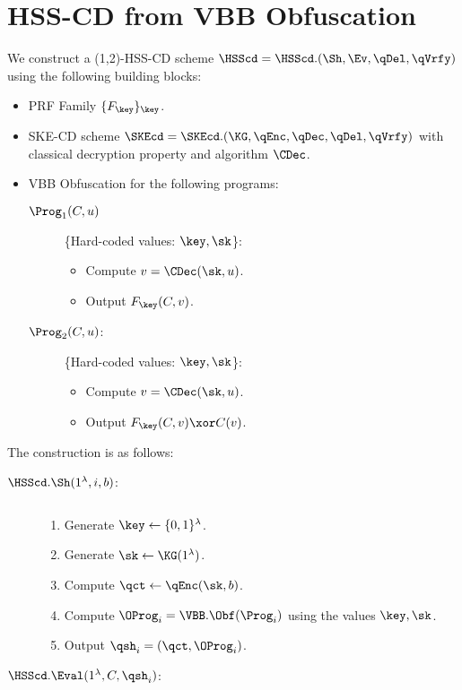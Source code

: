 \section{HSS-CD from VBB Obfuscation}\label{sec:hss-cd}

We construct a (1,2)-HSS-CD scheme $\HSScd = \HSScd.(\Sh,\Ev,\qDel,
\qVrfy)$ using
the following building blocks:

\begin{itemize}
\item PRF Family $\{F_\key\}_\key$.
\item SKE-CD scheme $\SKEcd=\SKEcd.(\KG, \qEnc, \qDec, \qDel,
\qVrfy)$ with classical decryption property and algorithm $\CDec$.
\item VBB Obfuscation for the following programs:
    \begin{description}
        \item [$\Prog_1(C, u)$]
            \{Hard-coded values: $\key, \sk$\}:
            \begin{itemize}
                \item Compute $v = \CDec(\sk, u)$.
                \item Output $F_\key(C, v)$.
            \end{itemize}

        \item [$\Prog_2(C, u)$:]
            \{Hard-coded values: $\key, \sk$\}:
            \begin{itemize}
                \item Compute $v = \CDec(\sk, u)$.
                \item Output $F_\key(C, v) \xor C(v)$.
            \end{itemize}
    \end{description}
\end{itemize}

The construction is as follows:

\begin{description}
\item [$\HSScd.\Sh(1^\lambda, i, b)$:] $ $
\begin{enumerate}
\item Generate $\key \gets \{0, 1\}^\lambda$.
\item Generate $\sk \gets \KG(1^\lambda)$.
\item Compute $\qct \gets \qEnc(\sk, b)$.
\item Compute $\OProg_i = \VBB.\Obf(\Prog_i)$ using the values
$\key, \sk$.
\item Output $\qsh_i = (\qct, \OProg_i)$.
\end{enumerate}

\item [$\HSScd.\Eval(1^\lambda, C, \qsh_i)$:] $ $

\end{description}
